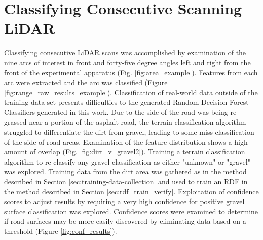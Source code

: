 \documentclass[numbered,pdftex]{ohio-etd}
\begin{document}
{{{	} %
		
	\section{Classifying Consecutive Scanning LiDAR}\label{sec:classify_consec_scan_lidar}{
	
		{Classifying consecutive LiDAR scans was accomplished by examination of the nine arcs of interest in front and forty-five degree angles left and right from the front of the experimental apparatus (Fig. \ref{fig:area_example}). Features from each arc were extracted and the arc was classified (Figure \ref{fig:range_raw_results_example}). Classification of real-world data outside of the training data set presents difficulties to the generated Random Decision Forest Classifiers generated in this work. Due to the side of the road was being re-grassed near a portion of the asphalt road, the terrain classification algorithm struggled to differentiate the dirt from gravel, leading to some miss-classification of the side-of-road areas. Examination of the feature distribution shows a high amount of overlap (Fig. \ref{fig:dirt_v_gravel2}). Training a terrain classification algorithm to re-classify any gravel classification as either "unknown" or "gravel" was explored. Training data from the dirt area was gathered as in the method described in Section \ref{sec:training-data-collection} and used to train an RDF in the method described in Section \ref{sec:rdf_train_verify}. Exploitation of confidence scores to adjust results by requiring a very high confidence for positive gravel surface classification was explored. Confidence scores were examined to determine if road surfaces may be more easily discovered by eliminating data based on a threshold (Figure \ref{fig:conf_results}). }
		
}}}
\end{document}
